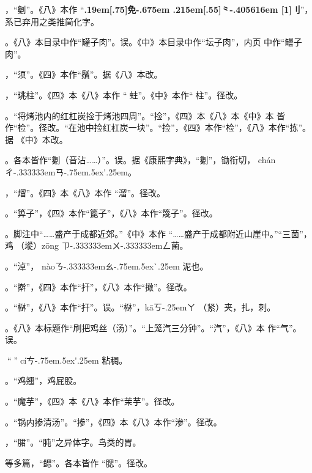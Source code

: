 \begin{list}{}
，“劖”。《八》本作
“{\bfseries\raise.19em\hbox{\scalebox{.675}[.75]{免}}\kern-.675em%
\lower.215em\hbox{\scalebox{.95}[.55]{⺀}}\kern-.405616em%
\scalebox{.65}[1]{刂}}”，系已弃用之类推简化字。

。《八》本目录中作“罐子肉”。误。《中》本目录中作“坛子肉”，内页
中作“罎子肉”。

，“须”。《四》本作“鬚”。据《八》本改。

，“珧柱”。《四》本《八》本作
“𧎼蛀”。《中》本作“𧎼柱”。径改。

。“将烤池内的红杠炭捡于烤池四周”。“捡”，《四》本《八》本《中》本
皆作“检”。径改。“在池中捡红杠炭一块”。“捡”，《四》本作“检”，《八》本作“拣”。据
《中》本改。

。各本皆作“劖（音沾……）”。误。据《康熙字典》，“劖”，锄衔切，
{ch\'{a}n}{ㄔ\kern-.333333emㄢ\kern-.75em\raise.5ex\hbox{\'{}}\kern.25em}。

，“熘”。《四》本《八》本作
“溜”。径改。

。“箅子”，《四》本作“篦子”，《八》本作“篾子”。径改。

。脚注{\footnotesize{}}中“……盛产于成都近郊。”《中》本作
“……盛产于成都附近山崖中。”“三菌”，鸡𭎂（㙡）{z\={o}ng}%
{ㄗ\kern-.333333emㄨ\kern-.333333emㄥ}菌。

。“淖”，
{n\`{a}o}{ㄋ\kern-.333333emㄠ\kern-.75em\raise.5ex\hbox{\`{}}\kern.25em} 泥也。

。“擀”，《四》本作“扞”，《八》本作“撖”。径改。

。“㮟”，《八》本作“扞”。误。“㮟”，{k\={a}}{ㄎ\kern-.25emㄚ}
（紧）夹，扎，刺。

。《八》本标题作“刷把鸡丝（汤）”。“上笼汽三分钟”。“汽”，《八》本
作“气”。误。

。“𫃕”，{c\'{i}}{ㄘ\kern-.75em\raise.5ex\hbox{\'{}}\kern.25em}
粘稠。

。“鸡翘”，鸡屁股。

。“魔芋”，《四》本《八》本作“茉芋”。径改。

。“锅内掺清汤”。“掺”，《四》本《八》本作“渗”。径改。

，“𬂁”。“肫”之异体字。鸟类的胃。

等多篇，“鳃”。各本皆作
“腮”。径改。


\end{list}
